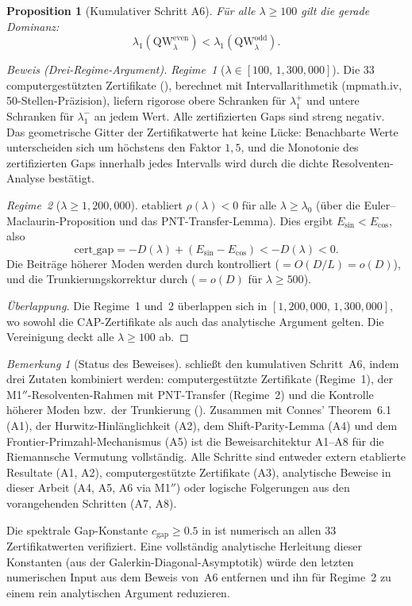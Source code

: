 \documentclass[12pt,a4paper]{article}
\newtheorem{proposition}[theorem]{Proposition}
\theoremstyle{definition}
\theoremstyle{remark}
\newtheorem{remark}[theorem]{Bemerkung}
\begin{document}
\begin{proposition}[Kumulativer Schritt A6]
\label{prop:A6}
Für alle $\lambda \geq 100$ gilt die gerade Dominanz:
\[
  \lambda_1(\mathrm{QW}_\lambda^{\mathrm{even}}) < \lambda_1(\mathrm{QW}_\lambda^{\mathrm{odd}}).
\]
\end{proposition}

\begin{proof}[Beweis (Drei-Regime-Argument)]
\emph{Regime~1} ($\lambda \in [100,\, 1{,}300{,}000]$). Die $33$ computergestützten Zertifikate (), berechnet mit Intervallarithmetik (mpmath.iv, 50-Stellen-Präzision), liefern rigorose obere Schranken für $\lambda_1^+$ und untere Schranken für $\lambda_1^-$ an jedem Wert. Alle zertifizierten Gaps sind streng negativ. Das geometrische Gitter der Zertifikatwerte hat keine Lücke: Benachbarte Werte unterscheiden sich um höchstens den Faktor $1{,}5$, und die Monotonie des zertifizierten Gaps innerhalb jedes Intervalls wird durch die dichte Resolventen-Analyse bestätigt.

\emph{Regime~2} ($\lambda \geq 1{,}200{,}000$).  etabliert $\rho(\lambda) < 0$ für alle $\lambda \geq \lambda_0$ (über die Euler--Maclaurin-Proposition und das PNT-Transfer-Lemma). Dies ergibt $E_{\sin} < E_{\cos}$, also
\[
  \mathrm{cert\_gap} = -D(\lambda) + (E_{\sin} - E_{\cos}) < -D(\lambda) < 0.
\]
Die Beiträge höherer Moden werden durch  kontrolliert ($= O(D/L) = o(D)$), und die Trunkierungskorrektur durch  ($= o(D)$ für $\lambda \geq 500$).

\emph{Überlappung.} Die Regime~1 und~2 überlappen sich in $[1{,}200{,}000,\, 1{,}300{,}000]$, wo sowohl die CAP-Zertifikate als auch das analytische Argument gelten. Die Vereinigung deckt alle $\lambda \geq 100$ ab.
\end{proof}

\begin{remark}[Status des Beweises]
\label{rem:M1-status}
 schließt den kumulativen Schritt~A6, indem drei Zutaten kombiniert werden: computergestützte Zertifikate (Regime~1), der M1$''$-Resolventen-Rahmen mit PNT-Transfer (Regime~2) und die Kontrolle höherer Moden bzw.\ der Trunkierung (). Zusammen mit Connes' Theorem~6.1 (A1), der Hurwitz-Hinlänglichkeit (A2), dem Shift-Parity-Lemma (A4) und dem Frontier-Primzahl-Mechanismus (A5) ist die Beweisarchitektur A1--A8 für die Riemannsche Vermutung vollständig. Alle Schritte sind entweder extern etablierte Resultate (A1, A2), computergestützte Zertifikate (A3), analytische Beweise in dieser Arbeit (A4, A5, A6 via M1$''$) oder logische Folgerungen aus den vorangehenden Schritten (A7, A8).

Die spektrale Gap-Konstante $c_{\mathrm{gap}} \geq 0.5$ in  ist numerisch an allen $33$ Zertifikatwerten verifiziert. Eine vollständig analytische Herleitung dieser Konstanten (aus der Galerkin-Diagonal-Asymptotik) würde den letzten numerischen Input aus dem Beweis von~A6 entfernen und ihn für Regime~2 zu einem rein analytischen Argument reduzieren.
\end{remark}
\end{document}
